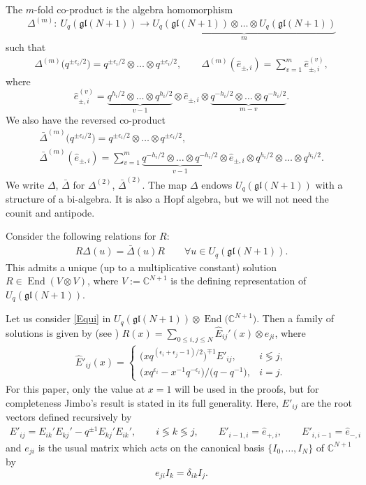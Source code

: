 \documentclass[pdftex]{sigma}
\numberwithin{equation}{section}
\newcommand{\C}{{\mathbb C}}
\DeclareMathOperator{\End}{End}
\newcommand{\Uqgl}{{U_q(\mathfrak{gl}(N+1))}}
\begin{document}
The $m$-fold co-product is the algebra homomorphism \[\Delta^{(m)}\colon \ \Uqgl \rightarrow \underbrace{\Uqgl \otimes \dots \otimes \Uqgl}_{m} \]
such that \begin{gather}
 \Delta^{(m)}\big (q^{\pm \epsilon_i/2}\big)= q^{\pm \epsilon_i/2} \otimes \dots \otimes q^{\pm \epsilon_i/2},\qquad
 \Delta^{(m)} (\hat{e}_{\pm ,i} ) =\sum_{v=1}^{m} \hat{e}^{(v)}_{\pm ,i} ,\label{qerel}
\end{gather}
where
\[
\hat{e}^{(v)}_{\pm ,i} = \underbrace{q^{h_i/2} \otimes \dots \otimes q^{h_i/2}}_{v-1} \otimes \hat{e}_{\pm ,i} \otimes \underbrace{ q^{-h_i/2} \otimes \dots \otimes q^{-h_i/2}}_{m-v}.
\]
 We also have the reversed co-product
 \begin{gather*}
 \bar{\Delta}^{(m)} \big(q^{\pm \epsilon_i/2}\big)= q^{\pm \epsilon_i/2} \otimes \dots \otimes q^{\pm \epsilon_i/2}, \\
 \bar{\Delta}^{(m)} (\hat{e}_{\pm, i})= \sum_{v=1}^{m} \underbrace{q^{-h_i/2} \otimes \dots \otimes q^{-h_i/2}}_{v-1} \otimes \hat{e}_{\pm, i} \otimes q^{h_i/2} \otimes \dots \otimes q^{h_i/2}.
 \end{gather*}
We write $\Delta$, $\bar{\Delta}$ for $\Delta^{(2)}$, $\bar{\Delta}^{(2)}$. The map $ \Delta $ endows $ \Uqgl $ with a structure of a bi-algebra. It is also a Hopf algebra, but we will not need the counit and antipode.

Consider the following relations for $R$:
\begin{gather}
 R \Delta(u) = \bar{\Delta}(u) R \qquad \forall u\in \Uqgl. \label{Equi}
\end{gather}
 This admits a unique (up to a multiplicative constant) solution
$ R \in \End (V\otimes V) $, where $ V:=\mathbb{C}^{N+1} $ is the defining representation of $ \Uqgl $.

 Let us consider \eqref{Equi} in $ \Uqgl \otimes \End \big(\C^{N+1}\big) $. Then a family of solutions is given by (see \cite{Jimbo1986}) $R(x)= \sum_{0 \leq i,j \leq N} \hat{E}_{ij}'(x) \otimes e_{ji} $, where
 \begin{gather*} %
 \hat{E}'_{ij}(x) = \begin{cases}
 \big(x q^{(\epsilon_i+\epsilon_j-1)/2}\big)^{\mp 1} {E}'_{ij} , & i \lessgtr j,\\
 \big(xq^{\epsilon_i}- x^{-1}q^{- \epsilon_i}\big)/\big(q-q^{-1}\big), & i=j.
 \end{cases}
 \end{gather*}
 For this paper, only the value at $x=1$ will be used in the proofs, but for completeness Jimbo's result is stated in its full generality. Here, $ E'_{ij} $ are the root vectors defined recursively by
 \begin{gather*}
E'_{ij}= E_{ik}'E_{kj}' -q^{\pm 1} E_{kj}'E_{ik}',\qquad i \lessgtr k \lessgtr j, \qquad E'_{i-1,i} = \hat{e}_{+,i}, \qquad E'_{i,i-1} = \hat{e}_{-,i}
\end{gather*}
and $e_{ji}$ is the usual matrix which acts on the canonical basis $\{I_0,\dots,I_N\}$ of $\mathbb{C}^{N+1}$ by
\[
e_{ji}I_k = \delta_{ik} I_j.
\]
\end{document}
